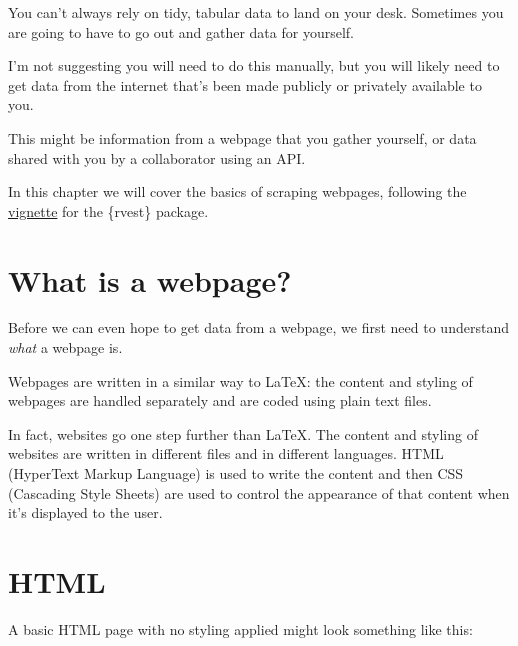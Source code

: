\documentclass[
  letterpaper,
  DIV=11,
  numbers=noendperiod]{scrreprt}
\begin{document}
You can't always rely on tidy, tabular data to land on your desk.
Sometimes you are going to have to go out and gather data for yourself.

I'm not suggesting you will need to do this manually, but you will
likely need to get data from the internet that's been made publicly or
privately available to you.

This might be information from a webpage that you gather yourself, or
data shared with you by a collaborator using an API.

In this chapter we will cover the basics of scraping webpages, following
the
\href{https://cran.r-project.org/web/packages/rvest/vignettes/rvest.html\#fnref3}{vignette}
for the \{rvest\} package.

\section{What is a webpage?}\label{what-is-a-webpage}

Before we can even hope to get data from a webpage, we first need to
understand \emph{what} a webpage is.

Webpages are written in a similar way to LaTeX: the content and styling
of webpages are handled separately and are coded using plain text files.

In fact, websites go one step further than LaTeX. The content and
styling of websites are written in different files and in different
languages. HTML (HyperText Markup Language) is used to write the content
and then CSS (Cascading Style Sheets) are used to control the appearance
of that content when it's displayed to the user.

\section{HTML}\label{html}

A basic HTML page with no styling applied might look something like
this:
\end{document}
